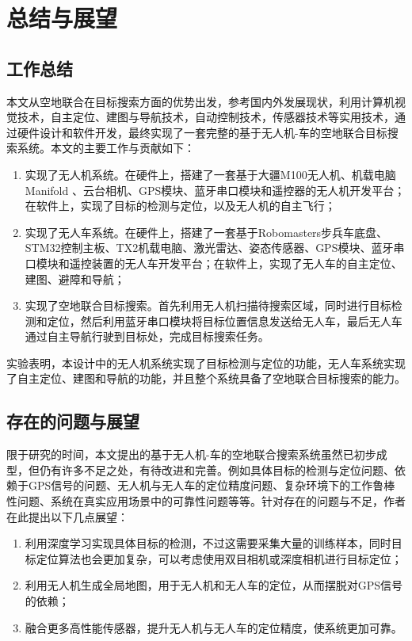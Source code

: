 
\chapter{总结与展望}
\section{工作总结}
本文从空地联合在目标搜索方面的优势出发，参考国内外发展现状，利用计算机视觉技术，自主定位、建图与导航技术，自动控制技术，传感器技术等实用技术，通过硬件设计和软件开发，最终实现了一套完整的基于无人机-车的空地联合目标搜索系统。本文的主要工作与贡献如下：

\begin{enumerate}[label=(\arabic*)] 
	\item 实现了无人机系统。在硬件上，搭建了一套基于大疆M100无人机、机载电脑Manifold 、云台相机、GPS模块、蓝牙串口模块和遥控器的无人机开发平台；在软件上，实现了目标的检测与定位，以及无人机的自主飞行；
	\item 实现了无人车系统。在硬件上，搭建了一套基于Robomasters步兵车底盘、STM32控制主板、TX2机载电脑、激光雷达、姿态传感器、GPS模块、蓝牙串口模块和遥控装置的无人车开发平台；在软件上，实现了无人车的自主定位、建图、避障和导航；
	\item 实现了空地联合目标搜索。首先利用无人机扫描待搜索区域，同时进行目标检测和定位，然后利用蓝牙串口模块将目标位置信息发送给无人车，最后无人车通过自主导航行驶到目标处，完成目标搜索任务。
\end{enumerate}

实验表明，本设计中的无人机系统实现了目标检测与定位的功能，无人车系统实现了自主定位、建图和导航的功能，并且整个系统具备了空地联合目标搜索的能力。

\section{存在的问题与展望}
限于研究的时间，本文提出的基于无人机-车的空地联合搜索系统虽然已初步成型，但仍有许多不足之处，有待改进和完善。例如具体目标的检测与定位问题、依赖于GPS信号的问题、无人机与无人车的定位精度问题、复杂环境下的工作鲁棒性问题、系统在真实应用场景中的可靠性问题等等。针对存在的问题与不足，作者在此提出以下几点展望：

\begin{enumerate}[label=(\arabic*)] 
	\item 利用深度学习实现具体目标的检测，不过这需要采集大量的训练样本，同时目标定位算法也会更加复杂，可以考虑使用双目相机或深度相机进行目标定位；
	\item 利用无人机生成全局地图，用于无人机和无人车的定位，从而摆脱对GPS信号的依赖；
	\item 融合更多高性能传感器，提升无人机与无人车的定位精度，使系统更加可靠。
\end{enumerate}